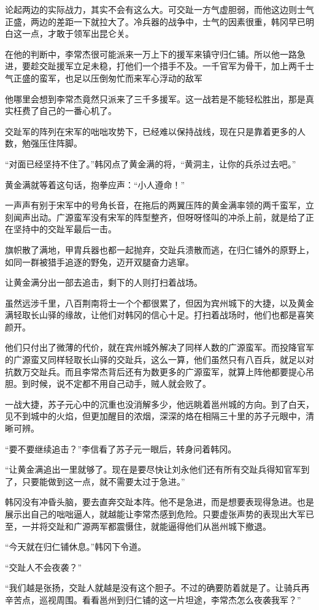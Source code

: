 论起两边的实际战力，其实不会有这么大。可交趾一方气虚胆弱，而他这边则士气正盛，两边的差距一下就拉大了。冷兵器的战争中，士气的因素很重，韩冈早已明白这一点，才敢于领军出昆仑关。

在他的判断中，李常杰很可能派来一万上下的援军来镇守归仁铺。所以他一路急进，要趁交趾援军立足未稳，打他们一个措手不及。一千官军为骨干，加上两千士气正盛的蛮军，也足以压倒匆忙而来军心浮动的敌军

他哪里会想到李常杰竟然只派来了三千多援军。这一战若是不能轻松胜出，那是真实枉费了自己的一番心机了。

交趾军的阵列在宋军的咄咄攻势下，已经难以保持战线，现在只是靠着更多的人数，勉强压住阵脚。

“对面已经坚持不住了。”韩冈点了黄金满的将，“黄洞主，让你的兵杀过去吧。”

黄金满就等着这句话，抱拳应声：“小人遵命！”

一声声有别于宋军中的号角长音，在拖后的两翼压阵的黄金满率领的两千蛮军，立刻闻声出动。广源蛮军没有宋军的阵型整齐，但呀呀怪叫的冲杀上前，就是给了正在坚持中的交趾军最后一击。

旗帜散了满地，甲胄兵器也都一起抛弃，交趾兵溃散而逃，在归仁铺外的原野上，如同一群被猎手追逐的野兔，迈开双腿奋力逃窜。

让黄金满分出一部去追击，剩下的人则打扫着战场。

虽然远涉千里，八百荆南将士一个个都很累了，但因为宾州城下的大捷，以及黄金满轻取长山驿的缘故，让他们对韩冈的信心十足。打扫着战场时，他们也都是喜笑颜开。

他们只付出了微薄的代价，就在宾州城外解决了同样人数的广源蛮军。而投降官军的广源蛮又同样轻取长山驿的交趾兵，这么一算，他们虽然只有八百兵，就足以对抗数万交趾兵。而且李常杰背后还有为数更多的广源蛮军，就算上阵他都要提心吊胆。到时候，说不定都不用自己动手，贼人就会败了。

一战大捷，苏子元心中的沉重也没消解多少，他远眺着邕州城的方向。到了白天，见不到城中的火焰，但更加醒目的浓烟，深深的烙在相隔三十里的苏子元眼中，清晰可辨。

“要不要继续追击？”李信看了苏子元一眼后，转身问着韩冈。

“让黄金满追出一里就够了。现在是要尽快让刘永他们还有所有交趾兵得知官军到了，只要能做到这一点，就不需要太过于急进。”

韩冈没有冲昏头脑，要去直奔交趾本阵。他不是急进，而是想要表现得急进。也是展示出自己的咄咄逼人，就越能让李常杰感到危险。只要虚张声势的表现出大军已至，一并将交趾和广源两军都震慑住，就能逼得他们从邕州城下撤退。

“今天就在归仁铺休息。”韩冈下令道。

“交趾人不会夜袭？”

“我们越是张扬，交趾人就越是没有这个胆子。不过的确要防着就是了。让骑兵再辛苦点，巡视周围。看看邕州到归仁铺的这一片坦途，李常杰怎么夜袭我军？”

